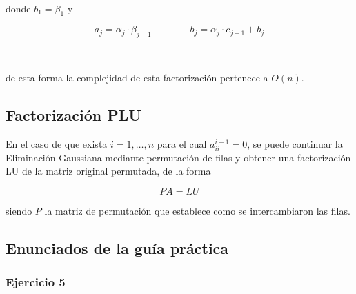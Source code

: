\

donde $b_1 = \beta_1$ y 

\[a_j = \alpha_j \cdot \beta_{j-1} ~~~~~~~~~~~~~~~~~~ b_j = \alpha_j \cdot c_{j-1} + b_j\]

\

de esta forma la complejidad de esta factorización pertenece a $O(n)$.

\subsection{Factorización PLU}\label{subsec:factorizacion_plu}

En el caso de que exista $i = 1,\ldots,n$ para el cual $a_{ii}^{i-1} = 0$, se puede continuar la Eliminación Gaussiana mediante permutación de filas y obtener una factorización LU de la matriz original permutada, de la forma 

\[PA = LU\]

siendo $P$ la matriz de permutación que establece como se intercambiaron las filas.

\subsection{Enunciados de la guía práctica}\label{subsec:enunciados_guia_2}

\subsubsection{Ejercicio 5}\label{subsubsec:guia_2_ej_5}


